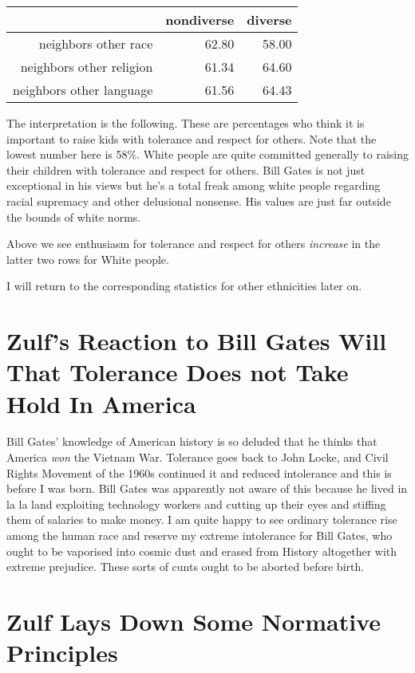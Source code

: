 \documentclass{amsart}
\begin{document}
\begin{table}[ht]
\centering
\begin{tabular}{rrr}
  \hline
 & nondiverse & diverse \\ 
  \hline
neighbors other race & 62.80 & 58.00 \\ 
  neighbors other religion & 61.34 & 64.60 \\ 
  neighbors other language & 61.56 & 64.43 \\ 
   \hline
\end{tabular}
\end{table}
The interpretation is the following.  These are percentages who think it is important to raise kids with tolerance and respect for others. Note that the lowest number here is 58\%.  White people are quite committed generally to raising their children with tolerance and respect for others.  Bill Gates is not just exceptional in his views but he's a total freak among white people regarding racial supremacy and other delusional nonsense.  His values are just far outside the bounds of white norms.

Above we see enthusiasm for tolerance and respect for others {\em increase} in the latter two rows for White people.

I will return to the corresponding statistics for other ethnicities later on.

\section{Zulf's Reaction to Bill Gates Will That Tolerance Does not Take Hold In America}

Bill Gates' knowledge of American history is so deluded that he thinks that America {\em won} the Vietnam War.  Tolerance goes back to John Locke, and Civil Rights Movement of the 1960s continued it and reduced intolerance and this is before I was born.  Bill Gates was apparently not aware of this because he lived in la la land exploiting technology workers and cutting up their eyes and stiffing them of salaries to make money.  I am quite happy to see ordinary tolerance rise among the human race and reserve my extreme intolerance for Bill Gates, who ought to be vaporised into cosmic dust and erased from History altogether with extreme prejudice.  These sorts of cunts ought to be aborted before birth.

\section{Zulf Lays Down Some Normative Principles}
\end{document}
